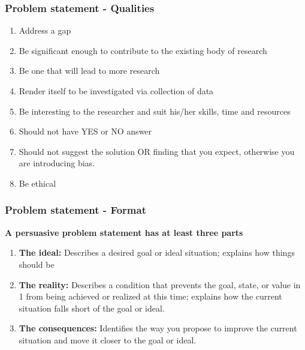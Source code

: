 \documentclass{beamer}
\begin{document}


\begin{frame}
\frametitle{\textbf{Problem statement - Qualities}}
\begin{enumerate}
\item Address a gap\\

\item Be significant enough to contribute to the existing body of research\\

\item Be one that will lead to more research \\

\item Render itself to be investigated via  collection of data \\

\item Be interesting to the researcher and suit his/her skills, time and resources\\
\item Should not have YES or NO answer\\
\item Should not suggest the solution OR finding that you expect,
otherwise you are introducing bias.\\
\item Be ethical\\

\end{enumerate}

\end{frame}



\begin{frame}
\frametitle{\textbf{Problem statement - Format}}
\begin{block}{\textbf{A persuasive problem statement has at least three parts}}
\begin{enumerate}
\item \textbf{The ideal:}  \large Describes a desired goal or ideal situation; explains how things should be\\

\item \textbf{The reality:}  \large Describes a condition that prevents the goal, state, or value in 1 from being achieved or realized at this time; explains how the current situation falls short of the goal or ideal.\\

\item  \textbf{The consequences:} \large Identifies the way you propose to improve the current situation and move it closer to the goal or ideal.\\


\end{enumerate}
\end{block}

\end{frame}
\end{document}
